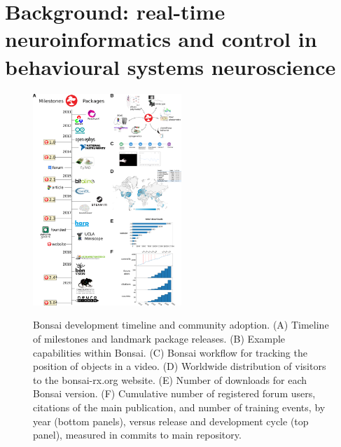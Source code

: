 \section{Background: real-time neuroinformatics and control in behavioural systems
  neuroscience}
  
\setlength{\columnsep}{1em}
\begin{figure}
    \href{http://www.gatsby.ucl.ac.uk/~rapela/bbsrc-bbr21/roadmap-bbsrc_noCaption.png}{\includegraphics[width=0.5\textwidth]{figures/roadmap-bbsrc_noCaption.png}}

  \caption{\footnotesize Bonsai development timeline and community adoption. (A) Timeline of
    milestones and landmark package releases. (B) Example capabilities 
    within Bonsai. (C) Bonsai workflow for tracking the position of objects
    in a video. (D) Worldwide
    distribution of visitors to the bonsai-rx.org website. (E)
    Number of downloads for each Bonsai version. (F) Cumulative number of
    registered forum users, citations of the main publication, and number of
    training events, by year (bottom panels), versus release and development
    cycle (top panel), measured in commits to main repository. 
    }

  \label{fig:bonsai}
\end{figure}

